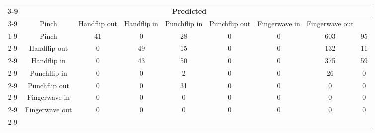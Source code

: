 \documentclass{standalone}
\begin{document}
 
 \begin{tabular}{|c |c |c |c |c |c |c |c |c |}
\cline{3-9}\multicolumn{2}{c|}{} & \multicolumn{7}{c|}{Predicted} \\ 
\cline{3-9} \multicolumn{2}{c |}{ } & Pinch & Handflip out & Handflip in & Punchflip in & Punchflip out & Fingerwave in & Fingerwave out\\ 
\cline{1-9}\multirow{7}{*}{\rotatebox[origin=c]{90}{Actual}} & Pinch & 41 & 0 & 28 & 0 & 0 & 603 & 95\\ 
 \cline{2-9} & Handflip out & 0 & 49 & 15 & 0 & 0 & 132 & 11\\ 
 \cline{2-9} & Handflip in & 0 & 43 & 50 & 0 & 0 & 375 & 59\\ 
 \cline{2-9} & Punchflip in & 0 & 0 & 2 & 0 & 0 & 26 & 0\\ 
 \cline{2-9} & Punchflip out & 0 & 0 & 31 & 0 & 0 & 0 & 0\\ 
 \cline{2-9} & Fingerwave in & 0 & 0 & 0 & 0 & 0 & 0 & 0\\ 
 \cline{2-9} & Fingerwave out & 0 & 0 & 0 & 0 & 0 & 0 & 0\\ 
 \cline{2-9}\hline \end{tabular}
 
\end{document}
